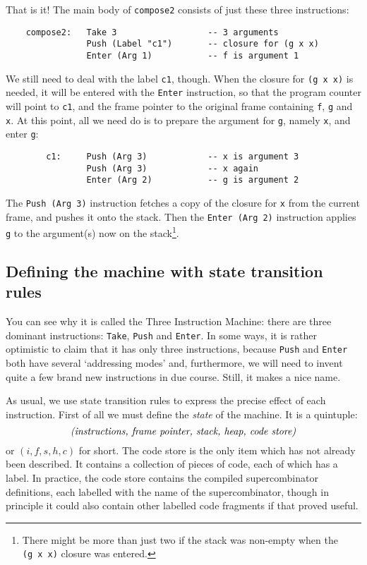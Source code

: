 That is it!  The main body of \mbox{\tt compose2} consists of just these three
instructions:
\begin{verbatim}
    compose2:   Take 3                  -- 3 arguments
                Push (Label "c1")       -- closure for (g x x)
                Enter (Arg 1)           -- f is argument 1
\end{verbatim}
We still need to deal with the label \mbox{\tt c1}, though.
When the closure for \mbox{\tt (g\ x\ x)} is needed, it will be entered with the \mbox{\tt Enter}
instruction, so that the program counter will point to \mbox{\tt c1}, and the
frame pointer to the original frame containing \mbox{\tt f}, \mbox{\tt g} and \mbox{\tt x}.
At this point, all we need do is to prepare the argument for \mbox{\tt g}, namely \mbox{\tt x},
and enter \mbox{\tt g}:
\begin{verbatim}
        c1:     Push (Arg 3)            -- x is argument 3
                Push (Arg 3)            -- x again
                Enter (Arg 2)           -- g is argument 2
\end{verbatim}
The \mbox{\tt Push\ (Arg\ 3)} instruction fetches a copy of the closure for \mbox{\tt x} from the
current frame, and pushes it onto the stack.  Then the \mbox{\tt Enter\ (Arg\ 2)}
instruction applies \mbox{\tt g} to the argument(s) now on the
stack\footnote{%
There might be more than just two if the stack was non-empty when the
\mbox{\tt (g\ x\ x)} closure was entered.}.

\subsection{Defining the machine with state transition rules}

You can see why it is called the Three Instruction Machine: there are
three dominant instructions: \mbox{\tt Take}, \mbox{\tt Push} and \mbox{\tt Enter}.  In some ways,
it is rather optimistic to claim that it has only three instructions,
because \mbox{\tt Push} and \mbox{\tt Enter} both have
several `addressing modes' and,
furthermore, we will need to invent quite a few
brand new instructions in due course.  Still, it makes a nice name.

As usual, we use state transition rules
to express the precise
effect of each instruction.
First of all we must define the {\em state\/} of the machine.  It is
a quintuple:
\[
\mbox{\em (instructions, frame pointer, stack, heap, code store)}
\]
or $(i,f,s,h,c)$ for short.
The code store is the only item which has not already been described.
It contains a collection
of pieces of code, each of which has a label.
In practice, the code store contains the compiled supercombinator definitions,
each labelled with the name of the supercombinator, though in principle it
could also contain other labelled code fragments if that proved useful.


